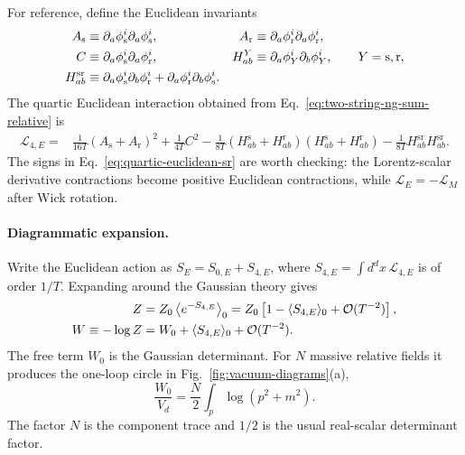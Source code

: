 For reference, define the Euclidean invariants
\begin{align}
  A_{\mathrm s} &\equiv
    \partial_a\phi_{\mathrm s}^i\partial_a\phi_{\mathrm s}^i,
  &
  A_{\mathrm r} &\equiv
    \partial_a\phi_{\mathrm r}^i\partial_a\phi_{\mathrm r}^i,
  \notag\\
  C &\equiv
    \partial_a\phi_{\mathrm s}^i\partial_a\phi_{\mathrm r}^i,
  &
  H^Y_{ab} &\equiv
    \partial_a\phi_Y^i\partial_b\phi_Y^i,
  \qquad Y=\mathrm s,\mathrm r,
  \notag\\
  H^{\mathrm{sr}}_{ab} &\equiv
    \partial_a\phi_{\mathrm s}^i\partial_b\phi_{\mathrm r}^i
   +\partial_a\phi_{\mathrm r}^i\partial_b\phi_{\mathrm s}^i .
\end{align}
The quartic Euclidean interaction obtained from
Eq.~\eqref{eq:two-string-ng-sum-relative} is
\begin{align}
  \mathcal L_{4,E}
  ={}& \frac{1}{16T}(A_{\mathrm s}+A_{\mathrm r})^2
      +\frac{1}{4T}C^2
      -\frac{1}{8T}
       (H^{\mathrm s}_{ab}+H^{\mathrm r}_{ab})
       (H^{\mathrm s}_{ab}+H^{\mathrm r}_{ab})
      -\frac{1}{8T}H^{\mathrm{sr}}_{ab}H^{\mathrm{sr}}_{ab} .
  \label{eq:quartic-euclidean-sr}
\end{align}
The signs in Eq.~\eqref{eq:quartic-euclidean-sr} are worth checking: the
Lorentz-scalar derivative contractions become positive Euclidean contractions,
while $\mathcal L_E=-\mathcal L_M$ after Wick rotation.

\paragraph{Diagrammatic expansion.}
Write the Euclidean action as $S_E=S_{0,E}+S_{4,E}$, where
$S_{4,E}=\int d^d x\,\mathcal L_{4,E}$ is of order $1/T$.  Expanding around
the Gaussian theory gives
\begin{align}
  Z
  &= Z_0\left\langle e^{-S_{4,E}}\right\rangle_0
   = Z_0\left[1-\langle S_{4,E}\rangle_0
      +\mathcal O(T^{-2})\right],
  \notag\\
  W\equiv-\log Z
  &= W_0+\langle S_{4,E}\rangle_0
     +\mathcal O(T^{-2}).
  \label{eq:vacuum-functional-expansion}
\end{align}
The free term $W_0$ is the Gaussian determinant.  For $N$ massive relative
fields it produces the one-loop circle in Fig.~\ref{fig:vacuum-diagrams}(a),
\begin{equation}
  \frac{W_0}{V_d}
  = \frac{N}{2}\int_p\log(p^2+m^2).
  \label{eq:gaussian-determinant-diagram-value}
\end{equation}
The factor $N$ is the component trace and $1/2$ is the usual real-scalar
determinant factor.

